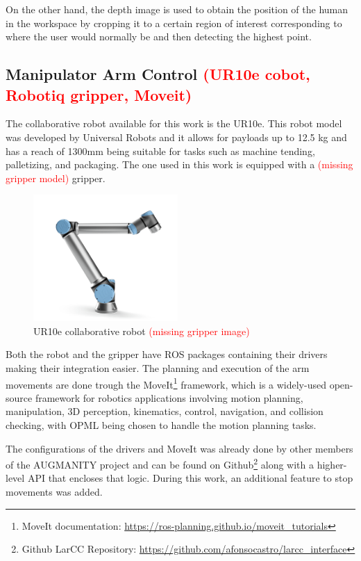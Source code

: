 On the other hand, the depth image is used to obtain the position of the human in the workspace by cropping it to a certain region of interest corresponding to where the user would normally be and then detecting the highest point.

\subsection{Manipulator Arm Control \textcolor{red}{(UR10e cobot, Robotiq gripper, Moveit)}}
\label{subsection:manipulator_arm_control}

The collaborative robot available for this work is the UR10e. This robot model was developed by Universal Robots and it allows for payloads up to 12.5 kg and has a reach of 1300mm being suitable for tasks such as machine tending, palletizing, and packaging\cite{UR10e}. The one used in this work is equipped with a \textcolor{red}{(missing gripper model)} gripper.

\begin{figure}[!ht]
\centerline{\includegraphics[width=0.49\textwidth]{figs/UR10e.png}}
\caption[UR10e]{UR10e collaborative robot \cite{UR10e_image} \textcolor{red}{(missing gripper image)}}
\label{fig:ur10e}
\end{figure}

Both the robot and the gripper have ROS packages containing their drivers making their integration easier. The planning and execution of the arm movements are done trough the MoveIt\footnote{MoveIt documentation: \url{https://ros-planning.github.io/moveit_tutorials}} framework, which is a widely-used open-source framework for robotics applications involving motion planning, manipulation, 3D perception, kinematics, control, navigation, and collision checking, with OPML being chosen to handle the motion planning tasks.

The configurations of the drivers and MoveIt was already done by other members of the AUGMANITY project and can be found on Github\footnote{Github LarCC Repository: \url{https://github.com/afonsocastro/larcc_interface}} along with a higher-level API that encloses that logic. During this work, an additional feature to stop movements was added.

